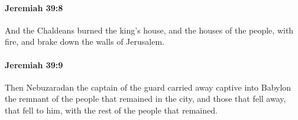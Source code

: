 		\paragraph{Jeremiah 39:8} %
			\label{JEREMIAH-39-8}

			And the Chaldeans burned the king’s house, and the houses of the people, with fire, and brake down the walls of Jerusalem.


		\paragraph{Jeremiah 39:9} %
			\label{JEREMIAH-39-9}

			Then Nebuzaradan the captain of the guard carried away captive into Babylon the remnant of the people that remained in the city, and those that fell away, that fell to him, with the rest of the people that remained.


